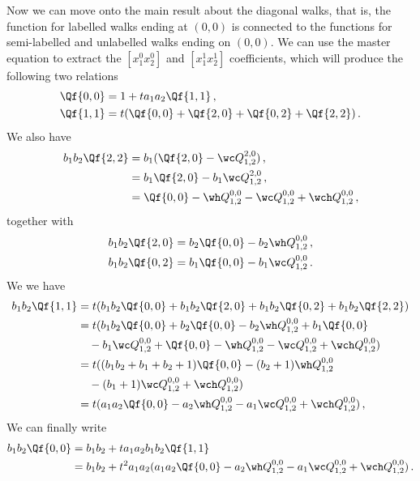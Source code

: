 Now we can move onto the main result about the diagonal walks, that is, the function for labelled walks ending at $(0,0)$ is connected to the functions for semi-labelled and unlabelled walks ending on $(0,0)$. We can use the master equation to extract the $[x_1^0x_2^0]$ and $[x_1^1x_2^1]$ coefficients, which will produce the following two relations
\begin{align}
	\Qf{0,0} &= 1 + ta_1a_2 \Qf{1,1}\,,\\
	\Qf{1,1} &= t(\Qf{0,0}+\Qf{2,0}+\Qf{0,2}+\Qf{2,2})\,.
\end{align}
We also have
\begin{align}
\begin{split}
	b_1b_2\Qf{2,2} &= b_1(\Qf{2,0}-\wc Q_{1,2}^{2,0})\,,\\
	&= b_1 \Qf{2,0} - b_1\wc Q_{1,2}^{2,0}\,,\\
	&= \Qf{0,0}-\wh Q_{1,2}^{0,0}-\wc Q_{1,2}^{0,0}+\wch Q_{1,2}^{0,0}\,,
\end{split}
\end{align}
together with
\begin{align}
	b_1b_2\Qf{2,0} &= b_2 \Qf{0,0} - b_2 \wh Q_{1,2}^{0,0}\,,\\
	b_1b_2\Qf{0,2} &= b_1 \Qf{0,0} - b_1 \wc Q_{1,2}^{0,0}\,.
\end{align}
We we have
\begin{align}
\begin{split}
b_1b_2\Qf{1,1} &= t(b_1b_2\Qf{0,0}+b_1b_2\Qf{2,0}+b_1b_2\Qf{0,2}+b_1b_2\Qf{2,2})\\
	&= t(b_1b_2\Qf{0,0}+ b_2 \Qf{0,0} - b_2 \wh Q_{1,2}^{0,0}+ b_1 \Qf{0,0} \\
	&\quad- b_1 \wc Q_{1,2}^{0,0}+\Qf{0,0}-\wh Q_{1,2}^{0,0}-\wc Q_{1,2}^{0,0}+\wch Q_{1,2}^{0,0})\\
	&= t((b_1b_2+b_1+b_2+1)\Qf{0,0}-(b_2+1)\wh Q_{1,2}^{0,0}\\
	&\quad-(b_1+1)\wc Q_{1,2}^{0,0}+\wch Q_{1,2}^{0,0})\\
	&=t(a_1a_2\Qf{0,0}-a_2\wh Q_{1,2}^{0,0}-a_1\wc Q_{1,2}^{0,0}+\wch Q_{1,2}^{0,0})\,,
\end{split}
\end{align}
We can finally write
\begin{align}
\begin{split}
	b_1b_2\Qf{0,0} &= b_1b_2 + ta_1a_2b_1b_2\Qf{1,1}\\
		& =  b_1b_2 + t^2a_1a_2(a_1a_2\Qf{0,0}-a_2\wh Q_{1,2}^{0,0}-a_1\wc Q_{1,2}^{0,0}+\wch Q_{1,2}^{0,0})\,.
\end{split}
\end{align}
